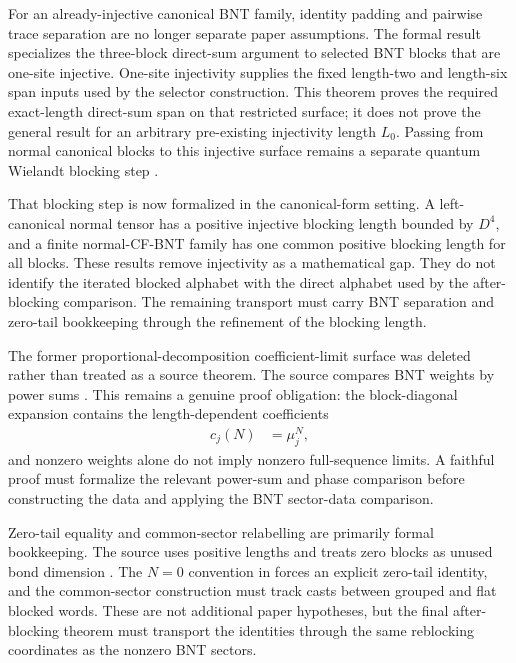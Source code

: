 \documentclass{article}
\begin{document}
For an already-injective canonical BNT family, identity padding and pairwise
trace separation are no longer separate paper assumptions. The formal result
specializes the three-block direct-sum argument to selected BNT blocks that are
one-site injective. One-site injectivity supplies the fixed length-two and
length-six span inputs used by the selector construction. This theorem proves
the required exact-length direct-sum span on that restricted surface; it does
not prove the general result for an arbitrary pre-existing injectivity length
$L_0$. Passing from normal canonical blocks to this injective surface remains
a separate quantum Wielandt blocking step \cite{Sanz2010Quantum}.

That blocking step is now formalized in the canonical-form setting. A
left-canonical normal tensor has a positive injective blocking length bounded by
$D^4$, and a finite normal-CF-BNT family has one common positive blocking
length for all blocks. These results remove injectivity as a mathematical gap.
They do not identify the iterated blocked alphabet with the direct alphabet used
by the after-blocking comparison. The remaining transport must carry BNT
separation and zero-tail bookkeeping through the refinement of the blocking
length.

The former proportional-decomposition coefficient-limit surface was deleted
rather than treated as a source theorem. The source compares BNT weights by
power sums \cite{Cirac2016MPDO_arXiv}. This remains a genuine proof obligation:
the block-diagonal expansion contains the length-dependent coefficients
\begin{align}
    c_j(N)
        &=
        \mu_j^N,
    \label{eq:rmp_nonperiodic_bnt_comparison_inputs_weight_length_power}
\end{align}
and nonzero weights alone do not imply nonzero full-sequence limits. A faithful
proof must formalize the relevant power-sum and phase comparison before
constructing the  data and
applying the BNT sector-data comparison.

Zero-tail equality and common-sector relabelling are primarily formal
bookkeeping. The source uses positive lengths and treats zero blocks as unused
bond dimension \cite{Cirac2016MPDO_arXiv}. The $N=0$ convention in
 forces an explicit zero-tail identity, and the
common-sector construction must track casts between grouped and flat blocked
words. These are not additional paper hypotheses, but the final after-blocking
theorem must transport the identities through the same reblocking coordinates
as the nonzero BNT sectors.
\end{document}

